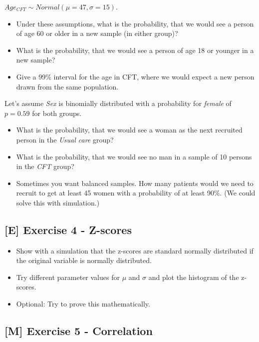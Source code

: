 \documentclass[
]{book}
\providecommand{\tightlist}{%
  \setlength{\itemsep}{0pt}\setlength{\parskip}{0pt}}
\begin{document}
\(Age_{CFT} \sim Normal(\mu = 47,\sigma = 15)\).

\begin{itemize}
\tightlist
\item
  Under these assumptions, what is the probability, that we would see a person of age 60 or older in a new sample (in either group)?
\item
  What is the probability, that we would see a person of age 18 or younger in a new sample?
\item
  Give a 99\% interval for the age in CFT,
  where we would expect a new person drawn from the same population.
\end{itemize}

Let's assume \emph{Sex} is binomially distributed with a probability for \emph{female} of \(p = 0.59\) for both groups.

\begin{itemize}
\tightlist
\item
  What is the probability, that we would see a woman as the next recruited person in the \emph{Usual care} group?
\item
  What is the probability, that we would see no man in a sample of 10 persons in the \emph{CFT} group?
\item
  Sometimes you want balanced samples. How many patients would we need to recruit to get at least 45 women with a probability of at least 90\%.
  (We could solve this with simulation.)
\end{itemize}

\subsection{{[}E{]} Exercise 4 - Z-scores}\label{exercise4_descriptive_stats}

\begin{itemize}
\tightlist
\item
  Show with a simulation that the z-scores are standard normally distributed if the original variable is normally distributed.
\item
  Try different parameter values for \(\mu\) and \(\sigma\) and plot the histogram of the z-scores.
\item
  Optional: Try to prove this mathematically.
\end{itemize}

\subsection{{[}M{]} Exercise 5 - Correlation}\label{exercise5_descriptive_stats}
\end{document}
